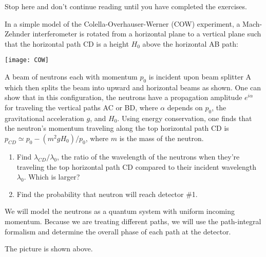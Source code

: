 Stop here and don't continue reading until you have completed the exercises.
\newpage
\begin{example}
In a simple model of the Colella-Overhauser-Werner (COW) experiment, a Mach-Zehnder interferometer is rotated from a horizontal plane to a vertical plane such that the horizontal path CD is a height $H_{0}$ above the horizontal AB path:

{\centering\texttt{[image: COW]}}

A beam of neutrons each with momentum $p_{0}$ is incident upon beam splitter A which then splits the beam into upward and horizontal beams as shown.  One can show that in this configuration, the neutrons have a propagation amplitude $e^{i\alpha}$ for traveling the vertical paths AC or BD, where $\alpha$ depends on $p_{0}$, the gravitational acceleration $g$, and $H_{0}$.  Using energy conservation, one finds that the neutron's momentum traveling along the top horizontal path CD is $p_{CD} \simeq p_{0} - (m^{2}gH_{0})/p_{0}$, where $m$ is the mass of the neutron.
\begin{enumerate}
\item Find $\lambda_{CD}/\lambda_{0}$,  the ratio of the wavelength of the neutrons when they're traveling the top horizontal path CD compared to their incident wavelength $\lambda_{0}$.   Which is larger?
\item Find the probability that neutron will reach detector \#1.  
\end{enumerate}

\model We will model the neutrons as a quantum system with uniform incoming momentum. Because we are treating different paths, we will use the path-integral formalism and determine the overall phase of each path at the detector.

\vis The picture is shown above.


\end{example}
